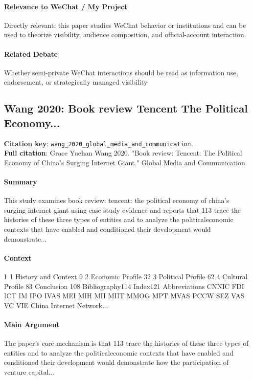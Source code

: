 \documentclass[12pt]{article}
\begin{document}
\paragraph{Relevance to WeChat / My Project} Directly relevant: this paper studies WeChat behavior or institutions and can be used to theorize visibility, audience composition, and official-account interaction.

\paragraph{Related Debate} Whether semi-private WeChat interactions should be read as information use, endorsement, or strategically managed visibility


\subsection{Wang 2020: Book review Tencent The Political Economy...}
\textbf{Citation key}: \texttt{wang\_2020\_global\_media\_and\_communication}.\\
\textbf{Full citation}: Grace Yuehan Wang 2020. "Book review: Tencent: The Political Economy of China's Surging Internet Giant." Global Media and Communication.

\paragraph{Summary} This study examines book review: tencent: the political economy of china's surging internet giant using case study evidence and reports that 113 trace the histories of these three types of entities and to analyze the politicaleconomic contexts that have enabled and conditioned their development would demonstrate...

\paragraph{Context}  1 1 History and Context 9 2 Economic Profile 32 3 Political Profile 62 4 Cultural Profile 83 Conclusion 108 Bibliography114 Index121 Abbreviations CNNIC FDI ICT IM IPO IVAS MEI MIH MII MIIT MMOG MPT MVAS PCCW SEZ VAS VC VIE China Internet Network...

\paragraph{Main Argument} The paper's core mechanism is that 113 trace the histories of these three types of entities and to analyze the politicaleconomic contexts that have enabled and conditioned their development would demonstrate how the participation of venture capital...
\end{document}

